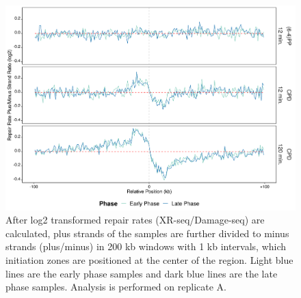 \begin{figure}[H]
\begin{center}
\includegraphics[width=\textwidth]{Chapters/7_appendix/figures/supfig44}
\caption[Repair rate plus/minus ratio of initiation zones in 200 kb (replicate A).]{After log2 transformed repair rates (XR-seq/Damage-seq) are calculated, plus strands of the samples are further divided to minus strands (plus/minus) in 200 kb windows with 1 kb intervals, which initiation zones are positioned at the center of the region. Light blue lines are the early phase samples and dark blue lines are the late phase samples. Analysis is performed on replicate A.}
\label{supfig:rrpm200inzonesA}
\end{center}
\end{figure}

